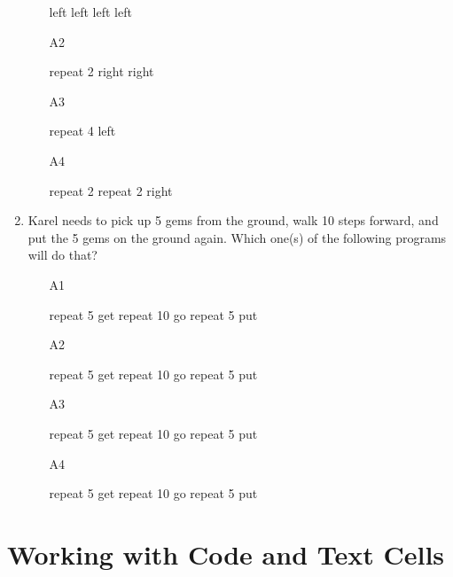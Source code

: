 \begin{enumerate}
\begin{enumerate}
\begin{bluecode}
 left
 left
 left
 left
\end{bluecode}
\item[A2] 
\begin{bluecode}
 repeat 2
     right
     right
\end{bluecode}
\item[A3] 
\begin{bluecode}
 repeat 4
     left
\end{bluecode}
\item[A4] 
\begin{bluecode}
 repeat 2
     repeat 2
         right
\end{bluecode}
\end{enumerate}
\item Karel needs to pick up 5 gems from the ground, walk 10 steps forward, and put the 5 gems 
      on the ground again. Which one(s) of the following programs will do that?
\begin{enumerate}
\item[A1] 
\begin{bluecode}
 repeat 5
     get
     repeat 10
         go
         repeat 5
             put
\end{bluecode}
\item[A2] 
\begin{bluecode}
 repeat 5
     get
 repeat 10
     go
 repeat 5
     put
\end{bluecode}
\item[A3] 
\begin{bluecode}
 repeat 5
     get
     repeat 10
         go
     repeat 5
         put
\end{bluecode}
\item[A4] 
\begin{bluecode}
 repeat 5
 get
 repeat 10
 go
 repeat 5
 put
\end{bluecode}
\end{enumerate}
\end{enumerate}


\section{Working with Code and Text Cells}

